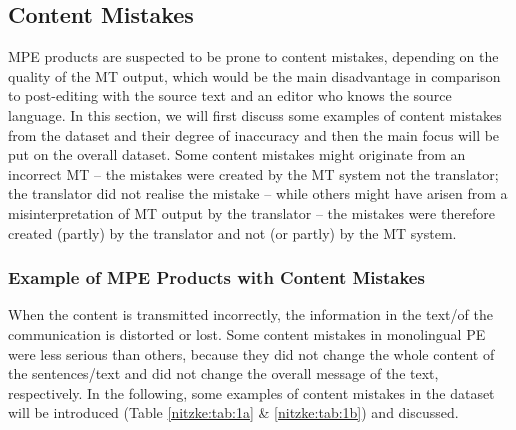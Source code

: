 \documentclass[output=paper]{langsci/langscibook}
\begin{document}
\subsection{Content Mistakes\label{nitzke:sec:ContentMistakes}}

MPE products are suspected to be prone to content mistakes, depending on the quality of the MT output, which would be the main disadvantage in comparison to post-editing with the source text and an editor who knows the source language. In this section, we will first discuss some examples of content mistakes from the dataset and their degree of inaccuracy and then the main focus will be put on the overall dataset. Some content mistakes might originate from an incorrect MT -- the mistakes were created by the MT system not the translator; the translator did not realise the mistake -- while others might have arisen from a misinterpretation of MT output by the translator -- the mistakes were therefore created (partly) by the translator and not (or partly) by the MT system.

\subsubsection{ Example of MPE Products with Content Mistakes\label{nitzke:sec:ExampleOfMPEProducts}}

When the content is transmitted incorrectly, the information in the text/of the communication is distorted or lost. Some content mistakes in monolingual PE were less serious than others, because they did not change the whole content of the sentences/text and did not change the overall message of the text, respectively. In the following, some examples of content mistakes in the dataset will be introduced (Table \ref{nitzke:tab:1a} \& \ref{nitzke:tab:1b}) and discussed.
\end{document}

